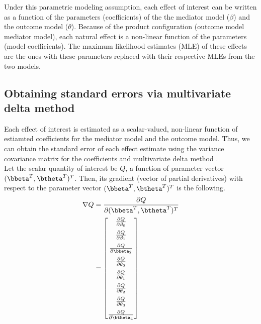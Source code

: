 \documentclass[dvipdfmx,10pt]{article}
\begin{document}
Under this parametric modeling assumption, each effect of interest can be written as a function of the parameters (coefficients) of the the mediator model (\(\beta\)) and the outcome model (\(\theta\)). Because of the product configuration (outcome model \texttimes{} mediator model), each natural effect is a non-linear function of the parameters (model coefficients). The maximum likelihood estimates (MLE) of these effects are the ones with these parameters replaced with their respective MLEs from the two models.

\subsection{Obtaining standard errors via multivariate delta method}
\label{sec:org7716760}

Each effect of interest is estimated as a scalar-valued, non-linear function of estiamted coefficients for the mediator model and the outcome model. Thus, we can obtain the standard error of each effect estimate using the variance covariance matrix for the coefficients and multivariate delta method \cite{hoefWhoInventedDelta2012}.\\

Let the scalar quantity of interest be \(Q\), a function of parameter vector \((\bbeta^{T},\btheta^{T})^{T}\). Then, its gradient (vector of partial derivatives) with respect to the parameter vector \((\bbeta^{T},\btheta^{T})^{T}\) is the following.\\

\begin{align*}
\nabla Q &= \frac{\partial Q}{\partial (\bbeta^{T},\btheta^{T})^{T}}\\
         &= \begin{bmatrix}
           \frac{\partial Q}{\partial \beta_{0}}\\[6pt]
           \frac{\partial Q}{\partial \beta_{1}}\\[6pt]
           \frac{\partial Q}{\partial \bbeta_{2}}\\[6pt]
           \frac{\partial Q}{\partial \theta_{0}}\\[6pt]
           \frac{\partial Q}{\partial \theta_{1}}\\[6pt]
           \frac{\partial Q}{\partial \theta_{2}}\\[6pt]
           \frac{\partial Q}{\partial \theta_{3}}\\[6pt]
           \frac{\partial Q}{\partial \btheta_{4}}\\
         \end{bmatrix}\\
\end{align*}
\end{document}
